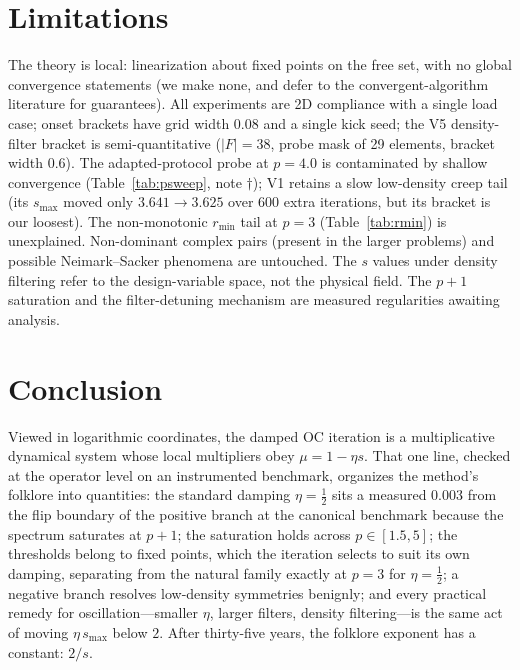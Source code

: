 \documentclass[11pt,a4paper]{article}
\newcommand{\smax}{s_{\max}}
\begin{document}
\section{Limitations}\label{sec:limits}

The theory is local: linearization about fixed points on the free set,
with no global convergence statements (we make none, and defer to the
convergent-algorithm literature for guarantees). All experiments are 2D
compliance with a single load case; onset brackets have grid width
$0.08$ and a single kick seed; the V5 density-filter bracket is
semi-quantitative ($|F|=38$, probe mask of 29 elements, bracket width
$0.6$). The adapted-protocol probe at $p=4.0$ is contaminated by shallow
convergence (Table~\ref{tab:psweep}, note $\dagger$); V1 retains a slow
low-density creep tail (its $\smax$ moved only $3.641\to3.625$ over 600
extra iterations, but its bracket is our loosest). The non-monotonic
$r_{\min}$ tail at $p=3$ (Table~\ref{tab:rmin}) is unexplained. Non-dominant
complex pairs (present in the larger problems) and possible
Neimark--Sacker phenomena are untouched. The $s$ values under density
filtering refer to the design-variable space, not the physical field. The
$p{+}1$ saturation and the filter-detuning mechanism are measured
regularities awaiting analysis.

\section{Conclusion}\label{sec:conclusion}

Viewed in logarithmic coordinates, the damped OC iteration is a
multiplicative dynamical system whose local multipliers obey
$\mu=1-\eta s$. That one line, checked at the operator level on an
instrumented benchmark, organizes the method's folklore into quantities:
the standard damping $\eta=\tfrac12$ sits a measured $0.003$ from the flip
boundary of the positive branch at the canonical benchmark because the
spectrum saturates at $p{+}1$; the saturation holds across
$p\in[1.5,5]$; the thresholds belong to fixed points, which the iteration
selects to suit its own damping, separating from the natural family
exactly at $p=3$ for $\eta=\tfrac12$; a negative branch resolves
low-density symmetries benignly; and every practical remedy for
oscillation---smaller $\eta$, larger filters, density filtering---is the
same act of moving $\eta\,\smax$ below $2$. After thirty-five years, the
folklore exponent has a constant: $2/s$.
\end{document}
